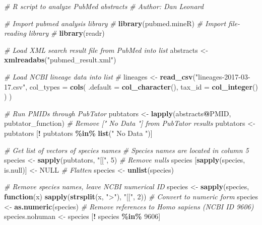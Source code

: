 \documentclass{../../../coursework}
\newenvironment{Shaded}{\begin{snugshade}}{\end{snugshade}}
\newcommand{\CommentTok}[1]{\textcolor[rgb]{0.56,0.35,0.01}{\textit{#1}}}
\newcommand{\ControlFlowTok}[1]{\textcolor[rgb]{0.13,0.29,0.53}{\textbf{#1}}}
\newcommand{\DataTypeTok}[1]{\textcolor[rgb]{0.13,0.29,0.53}{#1}}
\newcommand{\DecValTok}[1]{\textcolor[rgb]{0.00,0.00,0.81}{#1}}
\newcommand{\KeywordTok}[1]{\textcolor[rgb]{0.13,0.29,0.53}{\textbf{#1}}}
\newcommand{\NormalTok}[1]{#1}
\newcommand{\OperatorTok}[1]{\textcolor[rgb]{0.81,0.36,0.00}{\textbf{#1}}}
\newcommand{\OtherTok}[1]{\textcolor[rgb]{0.56,0.35,0.01}{#1}}
\newcommand{\StringTok}[1]{\textcolor[rgb]{0.31,0.60,0.02}{#1}}
\begin{document}
\begin{Shaded}
    \begin{Highlighting}[]
    \CommentTok{\# R script to analyze PubMed abstracts}
    \CommentTok{\# Author: Dan Leonard}
    
    \CommentTok{\# Import pubmed analysis library}
    \CommentTok{\# \parencite{Ran19}}
    \KeywordTok{library}\NormalTok{(pubmed.mineR)}
    \CommentTok{\# Import file{-}reading library}
    \CommentTok{\# \parencite{Wic18}}
    \KeywordTok{library}\NormalTok{(readr)}
    
    \CommentTok{\# Load XML search result file from PubMed into list}
    \NormalTok{abstracts <{-}}\StringTok{ }\KeywordTok{xmlreadabs}\NormalTok{(}\StringTok{"pubmed\_result.xml"}\NormalTok{)}
    
    \CommentTok{\# Load NCBI lineage data into list}
    \CommentTok{\# \parencite{Xue19}}
    \NormalTok{lineages <{-}}\StringTok{ }\KeywordTok{read\_csv}\NormalTok{(}\StringTok{"lineages{-}2017{-}03{-}17.csv"}\NormalTok{,}
        \DataTypeTok{col\_types =} \KeywordTok{cols}\NormalTok{(}
            \DataTypeTok{.default =} \KeywordTok{col\_character}\NormalTok{(),}
            \DataTypeTok{tax\_id =} \KeywordTok{col\_integer}\NormalTok{()}
    \NormalTok{    )}
    \NormalTok{)}
    
    \CommentTok{\# Run PMIDs through PubTator}
    \NormalTok{pubtators <{-}}\StringTok{ }\KeywordTok{lapply}\NormalTok{(abstracts}\OperatorTok{@}\NormalTok{PMID, pubtator\_function)}
    \CommentTok{\# Remove [" No Data "] from PubTator results}
    \NormalTok{pubtators <{-}}\StringTok{ }\NormalTok{pubtators [}\OperatorTok{!}\StringTok{ }\NormalTok{pubtators }\OperatorTok{\%in\%}\StringTok{ }\KeywordTok{list}\NormalTok{(}\StringTok{" No Data "}\NormalTok{)]}
    
    \CommentTok{\# Get list of vectors of species names}
    \CommentTok{\# Species names are located in column 5}
    \NormalTok{species <{-}}\StringTok{ }\KeywordTok{sapply}\NormalTok{(pubtators, }\StringTok{"[["}\NormalTok{, }\DecValTok{5}\NormalTok{)}
    \CommentTok{\# Remove nulls}
    \NormalTok{species [}\KeywordTok{sapply}\NormalTok{(species, is.null)] <{-}}\StringTok{ }\OtherTok{NULL}
    \CommentTok{\# Flatten}
    \NormalTok{species <{-}}\StringTok{ }\KeywordTok{unlist}\NormalTok{(species)}
    
    \CommentTok{\# Remove species names, leave NCBI numerical ID}
    \NormalTok{species <{-}}\StringTok{ }\KeywordTok{sapply}\NormalTok{(species, }\ControlFlowTok{function}\NormalTok{(x) }\KeywordTok{sapply}\NormalTok{(}\KeywordTok{strsplit}\NormalTok{(x, }\StringTok{">"}\NormalTok{), }\StringTok{"[["}\NormalTok{, }\DecValTok{2}\NormalTok{))}
    \CommentTok{\# Convert to numeric form}
    \NormalTok{species <{-}}\StringTok{ }\KeywordTok{as.numeric}\NormalTok{(species)}
    \CommentTok{\# Remove references to Homo sapiens (NCBI ID 9606)}
    \NormalTok{species.nohuman <{-}}\StringTok{ }\NormalTok{species [}\OperatorTok{!}\StringTok{ }\NormalTok{species }\OperatorTok{\%in\%}\StringTok{ }\DecValTok{9606}\NormalTok{]}
    

\end{Highlighting}
\end{Shaded}
\end{document}
